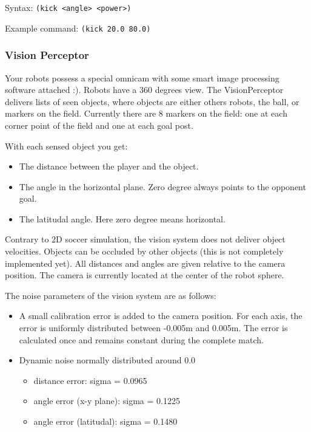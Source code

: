 Syntax: \texttt{(kick <angle> <power>)}

Example command: \texttt{(kick 20.0 80.0)}

\subsubsection{Vision Perceptor}

Your robots possess a special omnicam with some smart image processing
software attached :). Robots have a 360 degrees view. The
VisionPerceptor delivers lists of seen objects, where objects are
either others robots, the ball, or markers on the field. Currently
there are 8 markers on the field: one at each corner point of the
field and one at each goal post.

With each sensed object you get:

\begin{itemize}
  
\item The distance between the player and the object.
  
\item The angle in the horizontal plane. Zero degree always points to
  the opponent goal.

\item The latitudal angle. Here zero degree means horizontal.

\end{itemize}
  
Contrary to 2D soccer simulation, the vision system does not deliver
object velocities. Objects can be occluded by other objects (this is
not completely implemented yet). All distances and angles are given
relative to the camera position. The camera is currently located at
the center of the robot sphere.

The noise parameters of the vision system are as follows:

\begin{itemize}
  
\item A small calibration error is added to the camera position. For
  each axis, the error is uniformly distributed between -0.005m and
  0.005m. The error is calculated once and remains constant during the
  complete match.

\item Dynamic noise normally distributed around 0.0
  \begin{itemize}
    \item distance error:  sigma = 0.0965
    \item angle error (x-y plane): sigma = 0.1225
    \item  angle error (latitudal): sigma = 0.1480
    \end{itemize}
\end{itemize}

